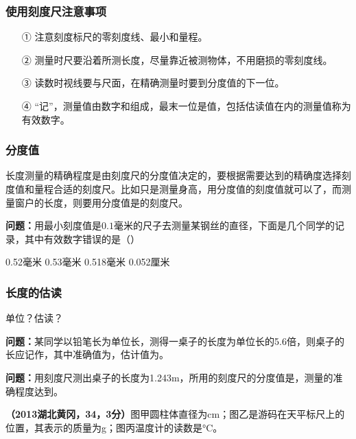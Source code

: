 \documentclass[12pt,twoside]{exam}
\begin{document}
\begin{knowledge}
\subsubsection{使用刻度尺注意事项}
\begin{enumerate}
\item[①] 注意刻度标尺的零刻度线、最小\answerline*[分度值]和量程。
\item[②] 测量时尺要沿着所测长度，尽量靠近被测物体，不用磨损的零刻度线。
\item[③] 读数时视线要与尺面\answerline*[垂直]，在精确测量时要到分度值的下一位。
\item[④] “记”，测量值由数字和\answerline*[单位]组成，最末一位是\answerline*[估读]值，包括估读值在内的测量值称为有效数字。
\end{enumerate}

\subsubsection{分度值}
长度测量的精确程度是由刻度尺的分度值决定的，要根据需要达到的精确度选择刻度值和量程合适的刻度尺。比如只是测量身高，用分度值\answerline*[cm]的刻度值就可以了，而测量窗户的长度，则要用分度值是\answerline*[mm]的刻度尺。

\textbf{问题：}用最小刻度值是$0.1$毫米的尺子去测量某钢丝的直径，下面是几个同学的记录，其中有效数字错误的是（\answerline*[C]）

\begin{oneparchoices}
\choice 0.52毫米
\choice 0.53毫米
\choice 0.518毫米
\choice 0.052厘米
\end{oneparchoices}


\subsubsection{长度的估读}
单位？估读？

\textbf{问题：}某同学以铅笔长为单位长，测得一桌子的长度为单位长的5.6倍，则桌子的长应记作，其中准确值为\answerline*[5铅笔长]，估计值为。


\textbf{问题：}用刻度尺测出桌子的长度为1.243m，所用的刻度尺的分度值是\answerline*[cm]，测量的准确程度达到\answerline*[1cm]。

\textbf{（2013湖北黄冈，34，3分）}图甲圆柱体直径为\answerline*[0.90]cm；图乙是游码在天平标尺上的位置，其表示的质量为\answerline*[1.2]g；图丙温度计的读数是\answerline*[9]\si{\degreeCelsius}。


\end{knowledge}
\end{document}

